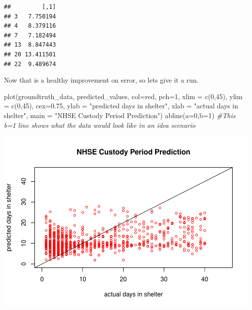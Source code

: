 \documentclass[
]{article}
\newenvironment{Shaded}{\begin{snugshade}}{\end{snugshade}}
\newcommand{\AttributeTok}[1]{\textcolor[rgb]{0.77,0.63,0.00}{#1}}
\newcommand{\CommentTok}[1]{\textcolor[rgb]{0.56,0.35,0.01}{\textit{#1}}}
\newcommand{\DecValTok}[1]{\textcolor[rgb]{0.00,0.00,0.81}{#1}}
\newcommand{\FloatTok}[1]{\textcolor[rgb]{0.00,0.00,0.81}{#1}}
\newcommand{\FunctionTok}[1]{\textcolor[rgb]{0.00,0.00,0.00}{#1}}
\newcommand{\NormalTok}[1]{#1}
\newcommand{\OtherTok}[1]{\textcolor[rgb]{0.56,0.35,0.01}{#1}}
\newcommand{\SpecialCharTok}[1]{\textcolor[rgb]{0.00,0.00,0.00}{#1}}
\newcommand{\StringTok}[1]{\textcolor[rgb]{0.31,0.60,0.02}{#1}}
\begin{document}
\begin{Shaded}
\end{Shaded}

\begin{verbatim}
##         [,1]
## 3   7.750194
## 4   8.379116
## 7   7.182494
## 13  8.847443
## 20 13.411501
## 22  9.489674
\end{verbatim}

Now that is a healthy improvement on error, so lets give it a run.

\begin{Shaded}
\begin{Highlighting}[]
\FunctionTok{plot}\NormalTok{(groundtruth\_data, predicted\_values, }\AttributeTok{col=}\StringTok{\textquotesingle{}red\textquotesingle{}}\NormalTok{, }\AttributeTok{pch=}\DecValTok{1}\NormalTok{, }
     \AttributeTok{xlim =} \FunctionTok{c}\NormalTok{(}\DecValTok{0}\NormalTok{,}\DecValTok{45}\NormalTok{), }\AttributeTok{ylim =} \FunctionTok{c}\NormalTok{(}\DecValTok{0}\NormalTok{,}\DecValTok{45}\NormalTok{), }\AttributeTok{cex=}\FloatTok{0.75}\NormalTok{, }
     \AttributeTok{ylab =} \StringTok{"predicted days in shelter"}\NormalTok{, }\AttributeTok{xlab =} \StringTok{"actual days in shelter"}\NormalTok{,}
     \AttributeTok{main =} \StringTok{"NHSE Custody Period Prediction"}\NormalTok{)}
\FunctionTok{abline}\NormalTok{(}\AttributeTok{a=}\DecValTok{0}\NormalTok{,}\AttributeTok{b=}\DecValTok{1}\NormalTok{) }\CommentTok{\#This b=1 line shows what the data would look like in an idea scenario}
\end{Highlighting}
\end{Shaded}

\includegraphics{neuralNet_files/figure-latex/unnamed-chunk-20-1}
\end{document}
